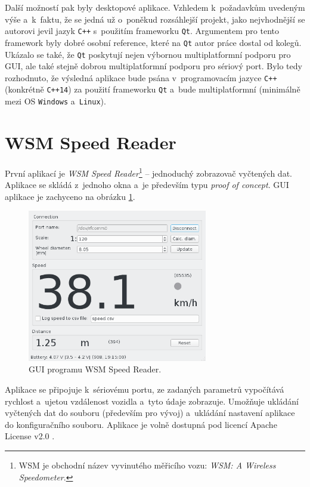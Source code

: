 Další možností pak byly desktopové aplikace. Vzhledem k~požadavkům uvedeným
výše a~k~faktu, že se jedná už o~poněkud rozsáhlejší projekt, jako nejvhodnější
se autorovi jevil jazyk \texttt{C++} s~použitím frameworku \texttt{Qt}.
Argumentem pro tento framework byly dobré osobní reference, které na
\texttt{Qt} autor práce dostal od kolegů. Ukázalo se také, že \texttt{Qt} poskytují
nejen výbornou multiplatformní podporu pro GUI, ale také stejně dobrou
multiplatformní podporu pro sériový port. Bylo tedy rozhodnuto, že výsledná
aplikace bude psána v~programovacím jazyce \texttt{C++} (konkrétně
\texttt{C++14}) za použití frameworku \texttt{Qt} a~bude multiplatformní
(minimálně mezi OS \texttt{Windows} a~\texttt{Linux}).

\section{\gls{WSM} Speed Reader}
\label{sec:sw-wsm-speed-reader}

První aplikací je \textit{\gls{WSM} Speed Reader}\footnote{\gls{WSM} je obchodní název
vyvinutého měřicího vozu: \textit{\gls{WSM}: A Wireless Speedometer}.} -- jednoduchý
zobrazovač vyčtených dat. Aplikace se skládá z~jednoho okna a~je především typu
\textit{proof of concept}. GUI aplikace je zachyceno na obrázku
\ref{fig:wsm-speed-reader-gui}.

\begin{figure}[ht]
\includegraphics[width=0.7\textwidth]{data/speed_reader_screenshot.png}
\caption{GUI programu \gls{WSM} Speed Reader.}
\label{fig:wsm-speed-reader-gui}
\end{figure}

Aplikace se připojuje k~sériovému portu, ze zadaných parametrů vypočítává
rychlost a~ujetou vzdálenost vozidla a~tyto údaje zobrazuje. Umožňuje ukládání
vyčtených dat do souboru (především pro vývoj) a~ukládání nastavení aplikace
do konfiguračního souboru. Aplikace je volně dostupná pod licencí Apache
License v2.0 \cite{wsm-speed-reader}.

